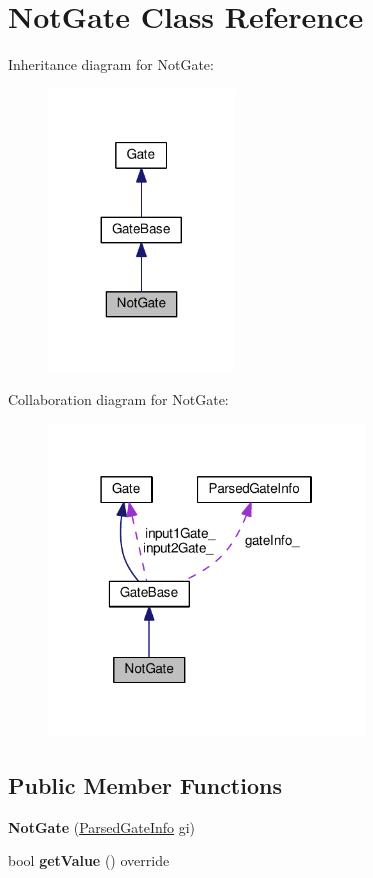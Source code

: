 \hypertarget{classNotGate}{}\section{Not\+Gate Class Reference}
\label{classNotGate}


Inheritance diagram for Not\+Gate\+:
\nopagebreak
\begin{figure}[H]
\begin{center}
\leavevmode
\includegraphics[width=140pt]{classNotGate__inherit__graph}
\end{center}
\end{figure}


Collaboration diagram for Not\+Gate\+:
\nopagebreak
\begin{figure}[H]
\begin{center}
\leavevmode
\includegraphics[width=238pt]{classNotGate__coll__graph}
\end{center}
\end{figure}
\subsection*{Public Member Functions}
\begin{DoxyCompactItemize}
\item 
{\bfseries Not\+Gate} (\hyperlink{structParsedGateInfo}{Parsed\+Gate\+Info} gi)\hypertarget{classNotGate_a7fdbc1cd0b9997d6f377ab41b97b3536}{}\label{classNotGate_a7fdbc1cd0b9997d6f377ab41b97b3536}

\item 
bool {\bfseries get\+Value} () override\hypertarget{classNotGate_a4c3c4bb46e237a8a4cab4f79175d380a}{}\label{classNotGate_a4c3c4bb46e237a8a4cab4f79175d380a}

\end{DoxyCompactItemize}
